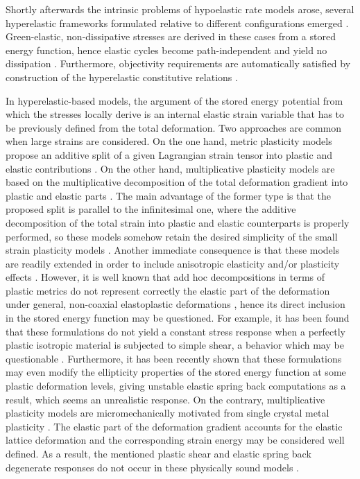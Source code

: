 \documentclass[preprint,review,12pt,sort&compress]{elsarticle}%
\begin{document}
Shortly afterwards the intrinsic problems of hypoelastic rate models arose,
several hyperelastic frameworks formulated relative to different
configurations emerged \cite{ArgyrisDoltsinis79,SimoOrtiz85}. Green-elastic,
non-dissipative stresses are derived in these cases from a stored energy
function, hence elastic cycles become path-independent and yield no
dissipation \cite{GabrielBathe95}. Furthermore, objectivity requirements are
automatically satisfied by construction of the hyperelastic constitutive
relations \cite{SimoHughesBook}.

In hyperelastic-based models, the argument of the stored energy potential from
which the stresses locally derive is an internal elastic strain variable that
has to be previously defined from the total deformation. Two approaches are
common when large strains are considered. On the one hand, metric plasticity
models propose an additive split of a given Lagrangian strain tensor into
plastic and elastic contributions \cite{GreenNaghdi65}. On the other hand,
multiplicative plasticity models are based on the multiplicative decomposition
of the total deformation gradient into plastic and elastic parts \cite{Lee69}.
The main advantage of the former type is that the proposed split is parallel
to the infinitesimal one, where the additive decomposition of the total strain
into plastic and elastic counterparts is properly performed, so these models
somehow retain the desired simplicity of the small strain plasticity models
\cite{SimoOrtiz85,Miehe98,PapadopoulusLu98}. Another immediate consequence is
that these models are readily extended in order to include anisotropic
elasticity and/or plasticity effects
\cite{PapadopoulusLu01,Miehe02,LobleinSchroderGruttmann03,SansourWagner03,Ulz09}%
. However, it is well known that add hoc decompositions in terms of plastic
metrics do not represent correctly the elastic part of the deformation under
general, non-coaxial elastoplastic deformations
\cite{LublinerBook,Miehe02,GreenNaghdi71,Schmidt05}, hence its direct
inclusion in the stored energy function may be questioned. For example, it has
been found that these formulations do not yield a constant stress response
when a perfectly plastic isotropic material is subjected to simple shear, a
behavior which may be questionable \cite{Itskov04}. Furthermore, it has been
recently shown \cite{NeffGhiba16} that these formulations may even modify the
ellipticity properties of the stored energy function at some plastic
deformation levels, giving unstable elastic spring back computations as a
result, which seems an unrealistic response. On the contrary, multiplicative
plasticity models are micromechanically motivated from single crystal metal
plasticity \cite{Taylor38,Rice71}. The elastic part of the deformation
gradient accounts for the elastic lattice deformation and the corresponding
strain energy may be considered well defined. As a result, the mentioned
plastic shear and elastic spring back degenerate responses do not occur in
these physically sound models \cite{Itskov04,NeffGhiba16}.
\end{document}
